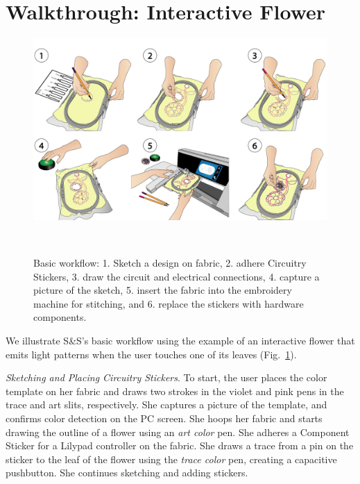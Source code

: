\documentclass[header.tex]{subfiles}
\begin{document}



\section{Walkthrough: Interactive Flower}
\begin{figure} [t!]
\centering
  \includegraphics[width=0.9\columnwidth]{figures/Walkthrough.png}
  \caption{Basic workflow: 1. Sketch a design on fabric, 2. adhere Circuitry Stickers, 3. draw the circuit and electrical connections, 4. capture a picture of the sketch, 5. insert the fabric into the embroidery machine for stitching, and 6. replace the stickers with hardware components.}~\label{fig:Walkthrough}
  \vspace{-2.2em}
\end{figure}

We illustrate S\&S's basic workflow using the example of an interactive flower that emits light patterns when the user touches one of its leaves (Fig.\ \ref{fig:Walkthrough}). %


\textit{Sketching and Placing Circuitry Stickers}. To start, the user places the color template on her fabric and draws two strokes in the violet and pink pens in the trace and art slits, respectively. She captures a picture of the template, and confirms color detection on the PC screen. She hoops her fabric and starts drawing the outline of a flower using an \textit{art color} pen. She adheres a Component Sticker for a Lilypad controller on the fabric. She draws a trace from a pin on the sticker to the leaf of the flower using the \textit{trace color} pen, creating a capacitive pushbutton. She continues sketching and adding stickers.
\end{document}
